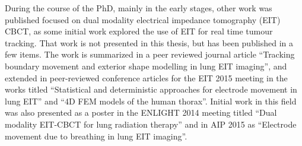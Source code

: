During the course of the PhD, mainly in the early stages, other work was published focused on dual modality electrical impedance tomography (EIT) CBCT, as some initial work explored the use of EIT for real time tumour tracking. That work is not presented in this thesis, but has been published in a few items. The work is summarized in a peer reviewed journal article ``Tracking boundary movement and exterior shape modelling in lung EIT imaging''\cite{biguri2015tracking}, and extended in peer-reviewed conference articles for the EIT 2015 meeting in the works titled ``Statistical and deterministic approaches for electrode movement in lung EIT''\cite{biguri2015statistical} and ``4D FEM models of the human thorax''\cite{biguri20154d}. Initial work in this field was also presented as a poster in the ENLIGHT 2014 meeting titled ``Dual modality EIT-CBCT for lung radiation therapy''\cite{biguri2015dual} and in AIP 2015 as ``Electrode movement due to breathing in lung EIT imaging''\cite{biguri2015electrode}.





